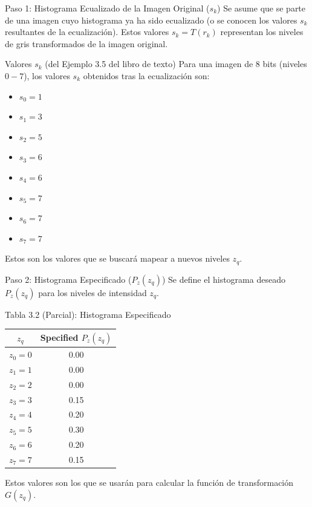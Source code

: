 \documentclass{beamer}
\begin{document}
\begin{frame}{Paso 1: Histograma Ecualizado de la Imagen Original ($s_k$)}
  Se asume que se parte de una imagen cuyo histograma ya ha sido ecualizado (o se conocen los valores $s_k$ resultantes de la ecualización). Estos valores $s_k = T(r_k)$ representan los niveles de gris transformados de la imagen original.

  \begin{exampleblock}{Valores $s_k$ (del Ejemplo 3.5 del libro de texto)}
    \footnotesize %
    Para una imagen de 8 bits (niveles $0-7$), los valores $s_k$ obtenidos tras la ecualización son:
    \begin{multicols}{2} %
        \begin{itemize}
            \item $s_0 = 1$
            \item $s_1 = 3$
            \item $s_2 = 5$
            \item $s_3 = 6$
            \item $s_4 = 6$
            \item $s_5 = 7$
            \item $s_6 = 7$
            \item $s_7 = 7$
        \end{itemize}
    \end{multicols}
    Estos son los valores que se buscará mapear a nuevos niveles $z_q$.
  \end{exampleblock}
\end{frame}

\begin{frame}{Paso 2: Histograma Especificado ($P_z(z_q)$)}
  Se define el histograma deseado $P_z(z_q)$ para los niveles de intensidad $z_q$.

  \begin{block}{Tabla 3.2 (Parcial): Histograma Especificado}
  \centering\footnotesize %
  \begin{tabular}{cc}
    \toprule
    $z_q$ & Specified $P_z(z_q)$ \\
    \midrule
    $z_0 = 0$ & 0.00 \\
    $z_1 = 1$ & 0.00 \\
    $z_2 = 2$ & 0.00 \\
    $z_3 = 3$ & 0.15 \\
    $z_4 = 4$ & 0.20 \\
    $z_5 = 5$ & 0.30 \\
    $z_6 = 6$ & 0.20 \\
    $z_7 = 7$ & 0.15 \\
    \bottomrule
  \end{tabular}
  \end{block}
  Estos valores son los que se usarán para calcular la función de transformación $G(z_q)$.
\end{frame}
\end{document}
